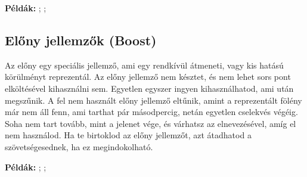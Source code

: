 \textbf{Példák:} ; ; 

\subsection[Előny jellemzők]{Előny jellemzők (Boost)}

Az előny egy speciális jellemző, ami egy rendkívül átmeneti, vagy kis hatású körülményt reprezentál. Az előny jellemző nem késztet, és nem lehet sors pont elköltésével kihasználni sem. Egyetlen egyszer ingyen kihasználhatod, ami után megszűnik. A fel nem használt előny jellemző eltűnik, amint a reprezentált fölény már nem áll fenn, ami tarthat pár másodpercig, netán egyetlen cselekvés végéig. Soha nem tart tovább, mint a jelenet vége, és várhatsz az elnevezésével, amíg el nem használod. Ha te birtoklod az előny jellemzőt, azt átadhatod a szövetségesednek, ha ez megindokolható.

\textbf{Példák:} ; ; 

